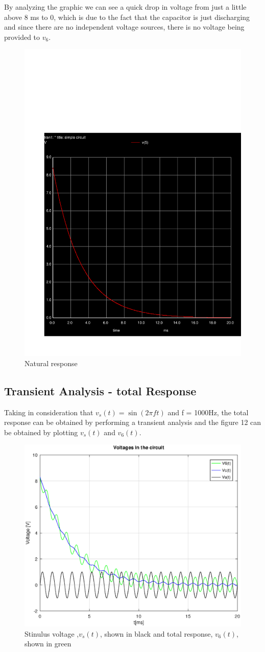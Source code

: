 By analyzing the graphic we can see a quick drop in voltage from just a little above 8 ms to 0, which is due to the fact that the capacitor is just discharging and since there are no independent voltage sources, there is no voltage being provided to $v_6$.

\begin{figure}[h!] \centering
\includegraphics[width=0.6\linewidth]{trans.pdf}
\caption{Natural response}
\label{fig:rc1}
\end{figure}


\subsection{Transient Analysis - total Response}

Taking in consideration that $v_s(t) = \sin(2\pi ft)$ and f = 1000Hz, the total response can be obtained by performing a transient analysis and the figure 12 can be obtained by plotting $v_s(t)$ and $v_6(t)$. 

\begin{figure}[h!] \centering
\includegraphics[width=0.6\linewidth]{global_voltage.eps}
\caption{Stinulus voltage ,$v_s(t)$, shown in black and total response, $v_6(t)$, shown in green}
\label{fig:rc1}
\end{figure}



